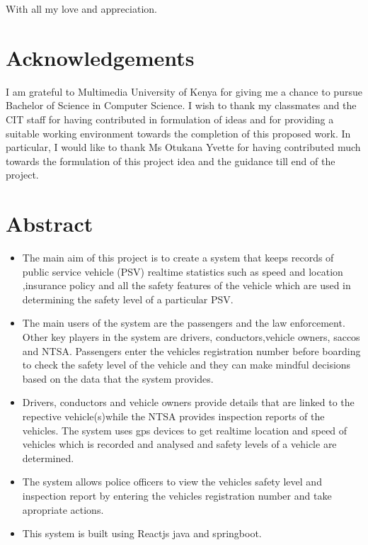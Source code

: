 \documentclass[a4paper, 12pt]{report}
\begin{document}
With all my love and appreciation.
\clearpage

\section{Acknowledgements}
I am grateful to Multimedia University of Kenya for giving me a chance to pursue Bachelor of Science in Computer Science. I wish to thank
my classmates and the CIT staff for having contributed in formulation of ideas and for
providing a suitable working environment towards the completion of this proposed work. In
particular, I would like to thank Ms Otukana Yvette for having contributed much towards the
formulation of this project idea and the guidance till end of the project.
\clearpage

\section{Abstract}
\begin{itemize}
\item The main aim of this project is to create a system that keeps records of
public service vehicle (PSV) realtime statistics such as speed and location
,insurance policy and all the safety features of the vehicle which are used in
determining the safety level of a particular PSV.
\item The main users of the system are the passengers and the law enforcement.
Other key players in the system are drivers, conductors,vehicle owners, saccos and NTSA. Passengers enter the vehicles registration number before
boarding to check the safety level of the vehicle and they can make mindful
decisions based on the data that the system provides.

\item Drivers, conductors and vehicle owners provide details that are linked to
the repective vehicle(s)while the NTSA provides inspection reports of the
vehicles. The system uses gps devices to get realtime location and speed
of vehicles which is recorded and analysed and safety levels of a vehicle are
determined.
\item The system allows police officers to view the vehicles safety level and inspection report by entering the vehicles registration number and take apropriate
actions.
\item This system is built using Reactjs  java and springboot.
\end{itemize}
\clearpage
\thispagestyle{empty}
\tableofcontents
\clearpage
\thispagestyle{empty}
\listoffigures
\clearpage
\end{document}
